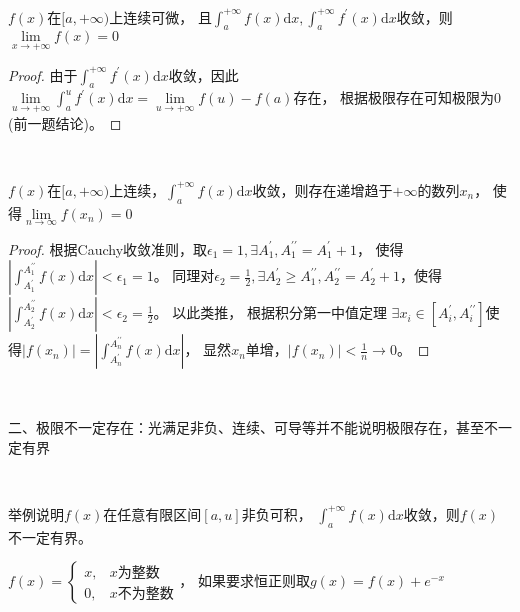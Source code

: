 ~

\begin{exercise}
  $f(x)$在$[a,+\infty)$上连续可微，
  且$\int_a^{+\infty}f(x)\mathrm{d}x,\int_a^{+\infty}f^{\prime}(x)\mathrm{d}x$收敛，则$\lim \limits _{x \rightarrow +\infty}f(x) = 0$
\end{exercise}

\begin{proof}
  由于$\int_a^{+\infty}f^{\prime}(x)\mathrm{d}x$收敛，因此$\lim \limits _{u \rightarrow +\infty}\int_a^uf^{\prime}(x)\mathrm{d}x = \lim \limits _{u \rightarrow +\infty}f(u) - f(a)$存在，
  根据极限存在可知极限为$0$(前一题结论)。
\end{proof}

~

\begin{exercise}
  $f(x)$在$[a,+\infty)$上连续，$\int_a^{+\infty}f(x)\mathrm{d}x$收敛，则存在递增趋于$+\infty$的数列$x_n$，
  使得$\lim \limits _{n \rightarrow \infty} f(x_n) = 0$
\end{exercise}

\begin{proof}
  根据Cauchy收敛准则，取$\epsilon_1 = 1, \exists A_1^{\prime}, A_1^{\prime\prime} = A_1^{\prime} + 1$，
  使得$|\int_{A_{1}^{\prime}}^{A_1^{\prime\prime}}f(x)\mathrm{d}x| < \epsilon_1 = 1$。
  同理对$\epsilon_2 = \frac{1}{2}, \exists A_2^{\prime} \geq A_1^{\prime\prime}, A_2^{\prime\prime} = A_2^{\prime} + 1$，使得$|\int_{A_2^{\prime}}^{A_2^{\prime\prime}}f(x)\mathrm{d}x| < \epsilon_2 = \frac{1}{2}$。
  以此类推，
  根据积分第一中值定理
  $\exists x_i \in [A_i^{\prime},A_i^{\prime\prime}]$使得$|f(x_n)| = |\int_{A_n^{\prime}}^{A_n^{\prime\prime}}f(x)\mathrm{d}x|$，
  显然$x_n$单增，$|f(x_n)| < \frac{1}{n} \rightarrow 0$。
\end{proof}

~

\noindent 二、极限不一定存在：光满足非负、连续、可导等并不能说明极限存在，甚至不一定有界

~

\begin{exercise}
  举例说明$f(x)$在任意有限区间$[a,u]$非负可积，
  $\int_a^{+\infty}f(x)\mathrm{d}x$收敛，则$f(x)$不一定有界。
\end{exercise}

\begin{solution}
  $f(x) =
  \begin{cases}
    x, &x\text{为整数}\\
    0,&x\text{不为整数}
  \end{cases}
  $，
  如果要求恒正则取$g(x) = f(x) + e^{-x}$
\end{solution}

